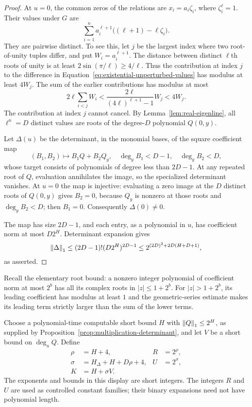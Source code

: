 \begin{proof}
At $u=0$, the common zeros of the relations are
$x_i=a_i\zeta_i$, where $\zeta_i^\ell=1$.  Their values under $G$ are
\begin{equation}\label{eq:existential-unperturbed-values}
 \sum_{i=1}^n a_i^{\ell+1}
             \bigl((\ell+1)-\ell\zeta_i\bigr).
\end{equation}
They are pairwise distinct.  To see this, let $j$ be the largest index
where two root-of-unity tuples differ, and put
$W_i=a_i^{\ell+1}$.  The distance between distinct $\ell$th roots of
unity is at least
$2\sin(\pi/\ell)\ge4/\ell$.  Thus the contribution at index $j$ to
the difference in Equation~\eqref{eq:existential-unperturbed-values}
has modulus at least $4W_j$.  The sum of the earlier contributions has
modulus at most
\[
 2\ell\sum_{i<j}W_i
 <\frac{2\ell}{(4\ell)^{\ell+1}-1}W_j
 <4W_j.
\]
The contribution at index $j$ cannot cancel.  By
Lemma~\ref{lem:real-eigenline}, all $\ell^n=D$ distinct values are roots
of the degree-$D$ polynomial $Q(0,y)$.

Let $\Delta(u)$ be the determinant, in the monomial bases, of the square
coefficient map
\begin{equation}\label{eq:existential-sylvester-map}
 (B_1,B_2)\longmapsto B_1Q+B_2Q_y,
 \quad \deg_y B_1<D-1,\quad \deg_y B_2<D,
\end{equation}
whose target consists of polynomials of degree less than $2D-1$.
At any repeated root of $Q$, evaluation annihilates the image, so the
specialized determinant vanishes.  At $u=0$ the map is injective:
evaluating a zero image at the $D$ distinct roots of $Q(0,y)$ gives
$B_2=0$, because $Q_y$ is nonzero at those roots and $\deg_y B_2<D$;
then $B_1=0$.  Consequently $\Delta(0)\ne0$.

The map has size $2D-1$, and each entry, as a polynomial in $u$, has
coefficient norm at most $D2^H$.  Determinant expansion gives
\[
 \left\lVert\Delta\right\rVert_1\le(2D-1)!(D2^H)^{2D-1}
 \le2^{(2D)^2+2D(H+D+1)},
\]
as asserted.
\end{proof}

Recall the elementary root bound: a nonzero integer polynomial of
coefficient norm at most $2^b$ has all its complex roots in
$|z|\le1+2^b$.  For $|z|>1+2^b$, its leading coefficient has modulus
at least $1$ and the geometric-series estimate makes its leading term
strictly larger than the sum of the lower terms.

Choose a polynomial-time computable short bound $H$ with
$\left\lVert Q\right\rVert_1\le2^H$, as supplied by
Proposition~\ref{prop:multiplication-determinant}, and let $V$ be a
short bound on $\deg_uQ$.  Define
\begin{equation}\label{eq:existential-specialization-parameters}
 \begin{aligned}
 \rho&=H+4,& R&=2^\rho,\\
 \sigma&=H_\Delta+H+D\rho+4,& U&=2^\sigma,\\
 K&=H+\sigma V.
 \end{aligned}
\end{equation}
The exponents and bounds in this display are short integers.  The
integers $R$ and $U$ are used as controlled constant families; their
binary expansions need not have polynomial length.

